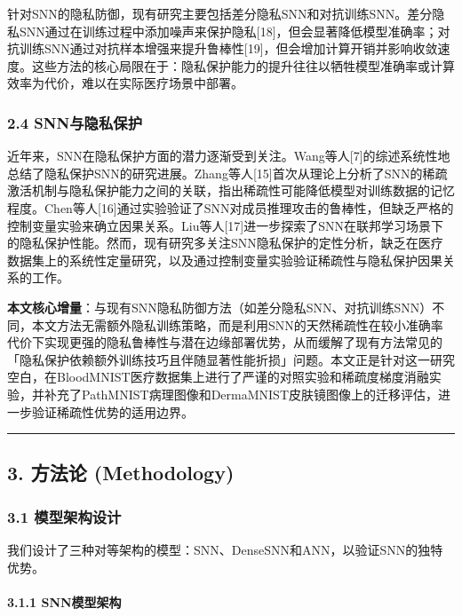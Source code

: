 \documentclass[
]{article}
\begin{document}
针对SNN的隐私防御，现有研究主要包括差分隐私SNN和对抗训练SNN。差分隐私SNN通过在训练过程中添加噪声来保护隐私{[}18{]}，但会显著降低模型准确率；对抗训练SNN通过对抗样本增强来提升鲁棒性{[}19{]}，但会增加计算开销并影响收敛速度。这些方法的核心局限在于：隐私保护能力的提升往往以牺牲模型准确率或计算效率为代价，难以在实际医疗场景中部署。

\subsubsection{2.4
SNN与隐私保护}\label{snnux4e0eux9690ux79c1ux4fddux62a4}

近年来，SNN在隐私保护方面的潜力逐渐受到关注。Wang等人{[}7{]}的综述系统性地总结了隐私保护SNN的研究进展。Zhang等人{[}15{]}首次从理论上分析了SNN的稀疏激活机制与隐私保护能力之间的关联，指出稀疏性可能降低模型对训练数据的记忆程度。Chen等人{[}16{]}通过实验验证了SNN对成员推理攻击的鲁棒性，但缺乏严格的控制变量实验来确立因果关系。Liu等人{[}17{]}进一步探索了SNN在联邦学习场景下的隐私保护性能。然而，现有研究多关注SNN隐私保护的定性分析，缺乏在医疗数据集上的系统性定量研究，以及通过控制变量实验验证稀疏性与隐私保护因果关系的工作。

\textbf{本文核心增量}：与现有SNN隐私防御方法（如差分隐私SNN、对抗训练SNN）不同，本文方法无需额外隐私训练策略，而是利用SNN的天然稀疏性在较小准确率代价下实现更强的隐私鲁棒性与潜在边缘部署优势，从而缓解了现有方法常见的「隐私保护依赖额外训练技巧且伴随显著性能折损」问题。本文正是针对这一研究空白，在BloodMNIST医疗数据集上进行了严谨的对照实验和稀疏度梯度消融实验，并补充了PathMNIST病理图像和DermaMNIST皮肤镜图像上的迁移评估，进一步验证稀疏性优势的适用边界。

\begin{center}\rule{0.5\linewidth}{0.5pt}\end{center}

\subsection{3. 方法论
(Methodology)}\label{ux65b9ux6cd5ux8bba-methodology}

\subsubsection{3.1
模型架构设计}\label{ux6a21ux578bux67b6ux6784ux8bbeux8ba1}

我们设计了三种对等架构的模型：SNN、DenseSNN和ANN，以验证SNN的独特优势。

\paragraph{3.1.1 SNN模型架构}\label{snnux6a21ux578bux67b6ux6784}
\end{document}
